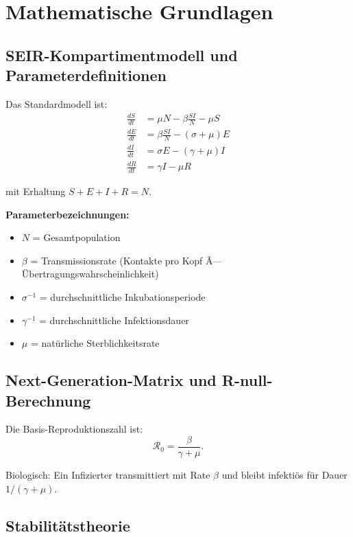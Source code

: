 ﻿\documentclass[a4paper,12pt,twoside]{article}
\theoremstyle{definition}
\begin{document}
\section{Mathematische Grundlagen}
\label{sec:math}

\subsection{SEIR-Kompartimentmodell und Parameterdefinitionen}

Das Standardmodell ist:
\begin{align}
\frac{dS}{dt} &= \mu N - \beta \frac{S I}{N} - \mu S \label{eq:seir_s} \\
\frac{dE}{dt} &= \beta \frac{S I}{N} - (\sigma + \mu) E \label{eq:seir_e} \\
\frac{dI}{dt} &= \sigma E - (\gamma + \mu) I \label{eq:seir_i} \\
\frac{dR}{dt} &= \gamma I - \mu R \label{eq:seir_r}
\end{align}

mit Erhaltung $S + E + I + R = N$.

\textbf{Parameterbezeichnungen:}
\begin{itemize}
\item $N$ = Gesamtpopulation
\item $\beta$ = Transmissionsrate (Kontakte pro Kopf Ã— Übertragungswahrscheinlichkeit)
\item $\sigma^{-1}$ = durchschnittliche Inkubationsperiode
\item $\gamma^{-1}$ = durchschnittliche Infektionsdauer
\item $\mu$ = natürliche Sterblichkeitsrate
\end{itemize}

\subsection{Next-Generation-Matrix und R-null-Berechnung}

Die Basis-Reproduktionszahl ist:
\[
\mathcal{R}_0 = \frac{\beta}{\gamma + \mu}.
\]

Biologisch: Ein Infizierter transmittiert mit Rate $\beta$ und bleibt infektiös für Dauer $1/(\gamma + \mu)$.

\subsection{Stabilitätstheorie}
\end{document}
